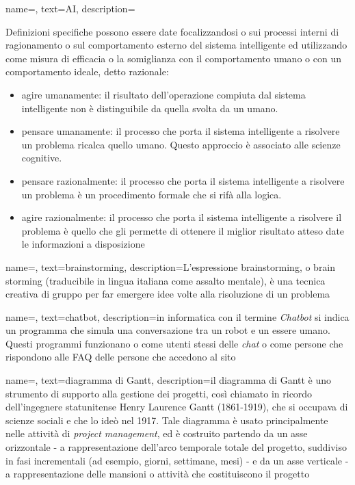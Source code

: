 {
    name=,
    text=AI,
    description={Definizioni specifiche possono essere date focalizzandosi o sui processi interni di ragionamento o sul comportamento esterno del sistema intelligente ed utilizzando come misura di efficacia o la somiglianza con il comportamento umano o con un comportamento ideale, detto razionale:
\begin{itemize}
	\item agire umanamente: il risultato dell’operazione compiuta dal sistema intelligente non è distinguibile da quella svolta da un umano.
	\item pensare umanamente: il processo che porta il sistema intelligente a risolvere un problema ricalca quello umano. Questo approccio è associato alle scienze cognitive.
	\item pensare razionalmente: il processo che porta il sistema intelligente a risolvere un problema è un procedimento formale che si rifà alla logica.
	\item agire razionalmente: il processo che porta il sistema intelligente a risolvere il problema è quello che gli permette di ottenere il miglior risultato atteso date le informazioni a disposizione
\end{itemize}}
}

{
    name=,
    text=brainstorming,
    description={L'espressione brainstorming, o brain storming (traducibile in lingua italiana come assalto mentale), è una tecnica creativa di gruppo per far emergere idee volte alla risoluzione di un problema}
}

{
    name=,
    text=chatbot,
    description={in informatica con il termine \emph{Chatbot} si indica un programma che simula una conversazione tra un robot e un essere umano. Questi programmi funzionano o come utenti stessi delle \emph{chat} o come persone che rispondono alle FAQ delle persone che accedono al sito}
}

{
    name=,
    text=diagramma di Gantt,
    description={il diagramma di Gantt è uno strumento di supporto alla
gestione dei progetti, così chiamato in ricordo dell'ingegnere statunitense Henry
Laurence Gantt (1861-1919), che si occupava di scienze sociali e che lo ideò
nel 1917. Tale diagramma è usato principalmente nelle attività di \emph{project
management}, ed è costruito partendo da un asse orizzontale - a rappresentazione
dell’arco temporale totale del progetto, suddiviso in fasi incrementali (ad esempio,
giorni, settimane, mesi) - e da un asse verticale - a rappresentazione delle mansioni
o attività che costituiscono il progetto}
}

